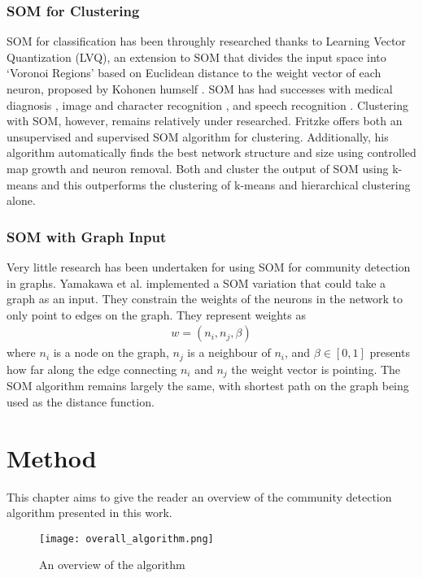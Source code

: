 \documentclass{report}
\begin{document}
\subsection{SOM for Clustering}
SOM for classification has been throughly researched \cite{kiang2001extending} thanks to Learning Vector Quantization (LVQ), an extension to SOM that divides the input space into `Voronoi Regions' based on Euclidean distance to the weight vector of each neuron, proposed by Kohonen humself \cite{kohonen1995learning}. SOM has had successes with medical diagnosis \cite{vercauteren1990classification}, image and character recognition \cite{sabourin1993modeling,delbimbo1993three}, and speech recognition \cite{leinonen1993self}. Clustering with SOM, however, remains relatively under researched. Fritzke \cite{fritzke1994growing} offers both an unsupervised and supervised SOM algorithm for clustering. Additionally, his algorithm automatically finds the best network structure and size using controlled map growth and neuron removal. Both \cite{kiang2001extending} and \cite{vesanto2000clustering} cluster the output of SOM using k-means and this outperforms the clustering of k-means and hierarchical clustering alone.

\subsection{SOM with Graph Input}
Very little research has been undertaken for using SOM for community detection in graphs. Yamakawa et al. \cite{yamakawa2006self} implemented a SOM variation that could take a graph as an input. They constrain the weights of the neurons in the network to only point to edges on the graph. They represent weights as
\begin{align*}
w = (n_i, n_j, \beta)
\end{align*}
where $n_i$ is a node on the graph, $n_j$ is a neighbour of $n_i$, and $\beta\in[0,1]$ presents how far along the edge connecting $n_i$ and $n_j$ the weight vector is pointing. The SOM algorithm remains largely the same, with shortest path on the graph being used as the distance function.

\chapter{Method}
This chapter aims to give the reader an overview of the community detection algorithm presented in this work.

\begin{figure}
\centering
\texttt{[image: overall\_algorithm.png]}
\caption{An overview of the algorithm}
\label{overview_diagram}
\end{figure}
\end{document}
